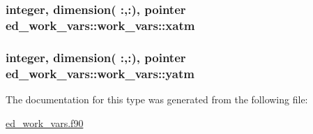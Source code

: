 \subsubsection[{\texorpdfstring{xatm}{xatm}}]{\setlength{\rightskip}{0pt plus 5cm}integer, dimension(  \+:,\+:), pointer ed\+\_\+work\+\_\+vars\+::work\+\_\+vars\+::xatm}\hypertarget{structed__work__vars_1_1work__vars_a2dfd450e7063a25617fc8827dd11de53}{}\label{structed__work__vars_1_1work__vars_a2dfd450e7063a25617fc8827dd11de53}
\subsubsection[{\texorpdfstring{yatm}{yatm}}]{\setlength{\rightskip}{0pt plus 5cm}integer, dimension(  \+:,\+:), pointer ed\+\_\+work\+\_\+vars\+::work\+\_\+vars\+::yatm}\hypertarget{structed__work__vars_1_1work__vars_a17db94cc26abac456241876d895a87b4}{}\label{structed__work__vars_1_1work__vars_a17db94cc26abac456241876d895a87b4}


The documentation for this type was generated from the following file\+:\begin{DoxyCompactItemize}
\item 
\hyperlink{ed__work__vars_8f90}{ed\+\_\+work\+\_\+vars.\+f90}\end{DoxyCompactItemize}
